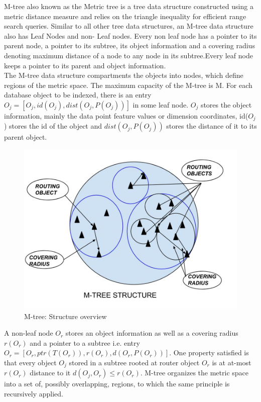

M-tree also known as the Metric tree is a tree data structure constructed using a metric distance measure and relies on the triangle inequality for efficient range search queries. Similar to all other tree data structures, an M-tree data structure also has Leaf Nodes and non- Leaf nodes. Every non leaf node has a pointer to its parent node, a pointer to its subtree, its object information and a covering radius denoting maximum distance of a node to any node in its subtree.Every leaf node keeps a pointer to its parent and object information.\\

The M-tree data structure compartments the objects into nodes, which define regions of the metric space. The maximum capacity of the M-tree is M. For each database object to be indexed, there is an entry $O_j = [ O_j, id(O_j), dist(O_j , P(O_j )) ]$
in some leaf node.  $O_j$ stores the object information, mainly the data point feature values or dimension coordinates, id($O_j$) stores the id of the object and $dist(O_j , P(O_j ))$ stores the distance of it to its parent object. \\

\begin{figure}[ht]	
\centering
\includegraphics[width=0.7 \columnwidth]{img/mtree.jpg}
\caption{M-tree: Structure overview}
\label{fig:4.0}
\end{figure}

A non-leaf node $O_r$ stores an object information as well as a covering radius $r(O_r)$ and a pointer to a subtree i.e. entry $O_r=[ O_r, ptr(T(O_r)), r(O_r), d(O_r, P(O_r)) ]$. One property satisfied is that every object $O_j$ stored in a subtree rooted at router object $O_r$ is at at-most $r(O_r)$ distance to it $d(O_j , O_r) ≤ r(O_r)$. M-tree organizes the metric space into a set of, possibly overlapping, regions, to which the same principle is recursively applied.\\




